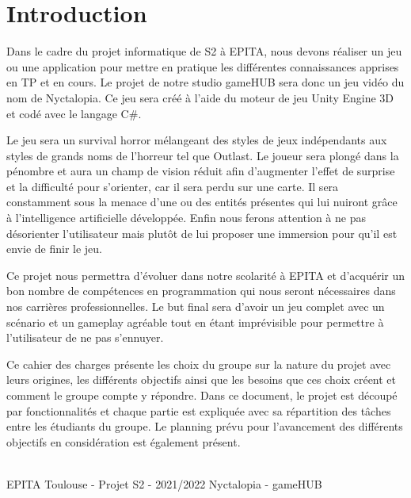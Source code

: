 \section{Introduction}
\setlength{\parindent}{5ex}
Dans le cadre du projet informatique de S2 à EPITA, nous devons réaliser un jeu ou une application pour mettre en pratique les différentes connaissances apprises en TP et en cours.
Le projet de notre studio gameHUB sera donc un jeu vidéo du nom de Nyctalopia. Ce jeu sera créé à l’aide du moteur de jeu Unity Engine 3D et codé avec le langage C\#.

\setlength{\parindent}{5ex} 
Le jeu sera un survival horror mélangeant des styles de jeux indépendants aux styles de grands noms de l'horreur tel que Outlast.
Le joueur sera plongé dans la pénombre et aura un champ de vision réduit afin d'augmenter l'effet de surprise et la difficulté pour s'orienter, car il sera perdu sur une carte. Il sera constamment sous la menace d'une ou des entités présentes qui lui nuiront grâce à l'intelligence artificielle développée. Enfin nous ferons attention à ne pas désorienter l'utilisateur mais plutôt de lui proposer une immersion pour qu'il est envie de finir le jeu.

\setlength{\parindent}{5ex}
Ce projet nous permettra d’évoluer dans notre scolarité à EPITA et d’acquérir
un bon nombre de compétences en programmation qui nous seront nécessaires
dans nos carrières professionnelles. Le but final sera d'avoir un jeu complet avec un scénario et un gameplay agréable tout en étant imprévisible pour permettre à l'utilisateur de ne pas s'ennuyer.

Ce cahier des charges présente les choix du groupe sur la nature du projet
avec leurs origines, les différents objectifs ainsi que les besoins que ces choix
créent et comment le groupe compte y répondre. Dans ce document, le projet
est découpé par fonctionnalités et chaque partie est expliquée avec sa répartition
des tâches entre les étudiants du groupe. Le planning prévu pour l’avancement
des différents objectifs en considération est également présent.

\vfill
\noindent\makebox[\linewidth]{\rule{.8\paperwidth}{.6pt}}\\[0.2cm]
EPITA Toulouse - Projet S2 - 2021/2022 \hfill Nyctalopia - gameHUB
\noindent\makebox[\linewidth]{\rule{.8\paperwidth}{.6pt}}

\newpage
